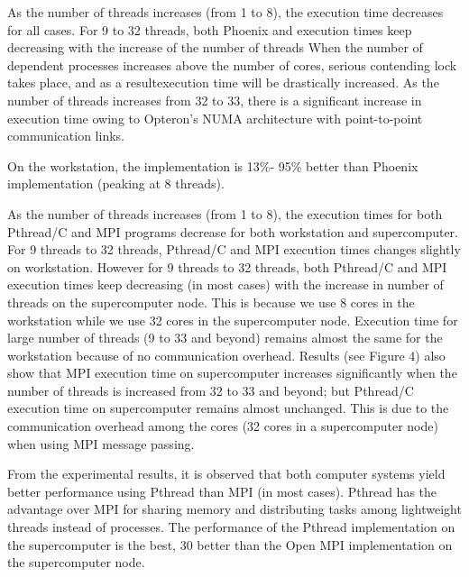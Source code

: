 As the number of threads increases (from 1 to 8), the
execution time decreases for all cases. For 9 to 32 threads,
both Phoenix and \myds execution times keep decreasing with
the increase of the number of threads
When the number of dependent processes increases above the
number of cores, 
serious contending lock takes place,
and as a resultexecution time will be drastically increased. 
As the number of threads increases from 32 to 33, 
there is a significant increase
in execution time owing to Opteron’s NUMA architecture with
point-to-point communication links.

On the workstation, the \myds implementation is 13\%-
95\% better than Phoenix implementation (peaking at 8
threads).

As the number of threads increases (from 1 to 8), the
execution times for both Pthread/C and MPI programs decrease
for both workstation and supercomputer. For 9 threads to 32
threads, Pthread/C and MPI execution times changes slightly
on workstation. However for 9 threads to 32 threads, both
Pthread/C and MPI execution times keep decreasing (in most
cases) with the increase in number of threads on the
supercomputer node. This is because we use 8 cores in the
workstation while we use 32 cores in the supercomputer node.
Execution time for large number of threads (9 to 33 and
beyond) remains almost the same for the workstation because
of no communication overhead. Results (see Figure 4) also
show that MPI execution time on supercomputer increases
significantly when the number of threads is increased from 32
to 33 and beyond; but Pthread/C execution time on
supercomputer remains almost unchanged. This is due to the
communication overhead among the cores (32 cores in a
supercomputer node) when using MPI message passing.

From the
experimental results, it is observed that both computer systems
yield better performance using Pthread than MPI (in most
cases). Pthread has the advantage over MPI for sharing
memory and distributing tasks among lightweight threads
instead of processes. The performance of the Pthread
implementation on the supercomputer is the best, 30%
better than the Open MPI implementation on the
supercomputer node.

